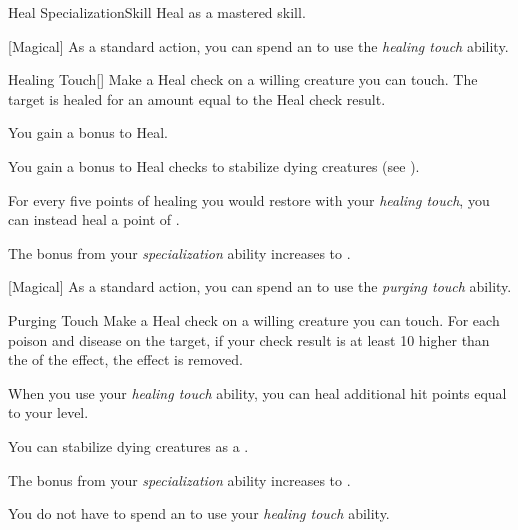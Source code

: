     \begin{feat}{Heal Specialization}{Skill}
        \featpre Heal as a mastered skill.

        [Magical] As a standard action, you can spend an  to use the \textit{healing touch} ability.
        \begin{ability}{Healing Touch}[]
            Make a Heal check on a willing creature you can touch.
            The target is healed for an amount equal to the Heal check result.
        \end{ability}

         You gain a  bonus to Heal.

         You gain a  bonus to Heal checks to stabilize dying creatures (see ).

         For every five points of healing you would restore with your \textit{healing touch}, you can instead heal a point of .

         The bonus from your \textit{specialization} ability increases to .

        [Magical] As a standard action, you can spend an  to use the \textit{purging touch} ability.
        \begin{ability}{Purging Touch}
            Make a Heal check on a willing creature you can touch.
            For each poison and disease on the target, if your check result is at least 10 higher than the  of the effect, the effect is removed.
        \end{ability}

         When you use your \textit{healing touch} ability, you can heal additional hit points equal to your level.

         You can stabilize dying creatures as a .

         The bonus from your \textit{specialization} ability increases to .

         You do not have to spend an  to use your \textit{healing touch} ability.
    \end{feat}

